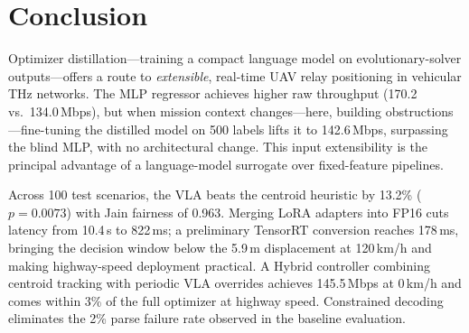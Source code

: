 \documentclass[journal]{IEEEtran}
\begin{document}
%
%
%


\section{Conclusion}
\label{sec:conclusion}

Optimizer distillation---training a compact language model on evolutionary-solver outputs---offers a route to \emph{extensible}, real-time UAV relay positioning in vehicular THz networks. The MLP regressor achieves higher raw throughput (170.2 vs.\ 134.0\,Mbps), but when mission context changes---here, building obstructions---fine-tuning the distilled model on 500 labels lifts it to 142.6\,Mbps, surpassing the blind MLP, with no architectural change. This input extensibility is the principal advantage of a language-model surrogate over fixed-feature pipelines.

Across 100 test scenarios, the VLA beats the centroid heuristic by 13.2\% ($p{=}0.0073$) with Jain fairness of 0.963. Merging LoRA adapters into FP16 cuts latency from 10.4\,s to 822\,ms; a preliminary TensorRT conversion reaches 178\,ms, bringing the decision window below the 5.9\,m displacement at 120\,km/h and making highway-speed deployment practical. A Hybrid controller combining centroid tracking with periodic VLA overrides achieves 145.5\,Mbps at 0\,km/h and comes within 3\% of the full optimizer at highway speed. Constrained decoding eliminates the 2\% parse failure rate observed in the baseline evaluation.
\end{document}
